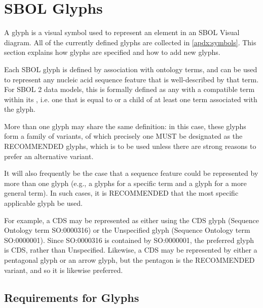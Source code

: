 \section{SBOL Glyphs}\label{sec:glyphs}

A glyph is a visual symbol used to represent an element in an SBOL Visual diagram.
All of the currently defined glyphs are collected in \ref{apdx:symbols}.
%
This section explains how glyphs are specified and how to add new glyphs.

Each SBOL glyph is defined by association with ontology terms, and can be used to represent any nucleic acid sequence feature that is well-described by that term.  
For SBOL 2 data models, this is formally defined as any  with a compatible term within its ,
 i.e. one that is equal to or a child of at least one term associated with the glyph.
 
More than one glyph may share the same definition: in this case, these glyphs form a family of variants, of which precisely one MUST be designated as the RECOMMENDED glyphs, which is to be used unless there are strong reasons to prefer an alternative variant.

It will also frequently be the case that a sequence feature could be represented by more than one glyph (e.g., a glyphs for a specific term and a glyph for a more general term).
In such cases, it is RECOMMENDED that the most specific applicable glyph be used.

For example, a CDS may be represented as either using the CDS glyph (Sequence Ontology term SO:0000316) or the Unspecified glyph (Sequence Ontology term SO:0000001).  
Since SO:0000316 is contained by SO:0000001, the preferred glyph is CDS, rather than Unspecified.
Likewise, a CDS may be represented by either a pentagonal glyph or an arrow glyph, but the pentagon is the RECOMMENDED variant, and so it is likewise preferred.  


\subsection{Requirements for Glyphs}

